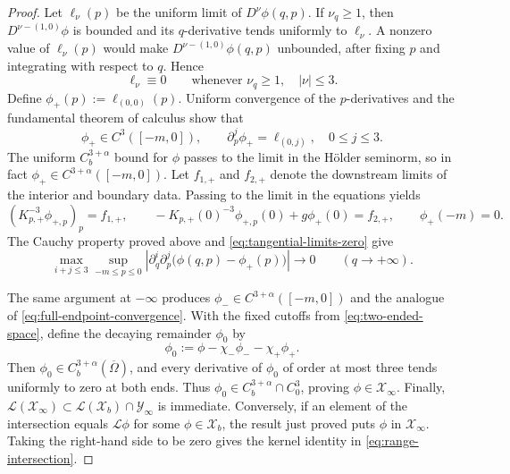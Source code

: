 \documentclass[10pt,a4paper]{amsart}
\theoremstyle{plain}
\begin{document}
\begin{proof}
		Let \(\ell_\nu(p)\) be the uniform limit of $D^\nu\phi(q,p)$.  If \(\nu_q\ge1\), then
		\(D^{\nu-(1,0)}\phi\) is bounded and its \(q\)-derivative tends uniformly to
		\(\ell_\nu\).  A nonzero value of \(\ell_\nu(p)\) would make
		\(D^{\nu-(1,0)}\phi(q,p)\) unbounded, after fixing
		\(p\) and integrating with respect to \(q\).   Hence
		\begin{equation}\label{eq:tangential-limits-zero}
			\ell_\nu\equiv0\qquad\text{whenever }\nu_q\ge1,\quad |\nu|\le3.
		\end{equation}
		Define \(\phi_+(p):=\ell_{(0,0)}(p)\).  Uniform convergence of the
		{$p$-derivatives and the fundamental theorem of calculus show that}
		\[
		\phi_+\in C^3([-m,0]),\qquad
		\partial_p^j\phi_+=\ell_{(0,j)},\quad 0\le j\le3.
		\]
		The uniform \(C_b^{3+\alpha}\) bound for \(\phi\) passes to the limit in
		the H\"older seminorm, so in fact \(\phi_+\in C^{3+\alpha}([-m,0])\).
	 {Let $f_{1,+}$ and $f_{2,+}$ denote the downstream limits of the interior and boundary data. Passing to the limit in the equations yields}
		\begin{equation*}
			(K_{p,+}^{-3}\phi_{+,p})_p=f_{1,+},\qquad
			-K_{p,+}(0)^{-3}\phi_{+,p}(0)+g\phi_+(0)=f_{2,+},\qquad
			\phi_+(-m)=0 .
		\end{equation*}
	{The Cauchy property proved above and \eqref{eq:tangential-limits-zero} give}
		\begin{equation}\label{eq:full-endpoint-convergence}
			\max_{i+j\le3}\sup_{-m\le p\le0}
			\left|\partial_q^i\partial_p^j
			\bigl(\phi(q,p)-\phi_+(p)\bigr)\right|
			\longrightarrow0\qquad(q\to+\infty).
		\end{equation}
		
		The same argument at \(-\infty\) produces
		\(\phi_-\in C^{3+\alpha}([-m,0])\) and the analogue of
		\eqref{eq:full-endpoint-convergence}. With the fixed cutoffs from
		{\eqref{eq:two-ended-space}, define the decaying remainder $\phi_0$ by}
		\[
		\phi_0:=\phi-\chi_-\phi_- -\chi_+\phi_+.
		\]
		Then \(\phi_0\in C_b^{3+\alpha}(\overline\Omega)\), and every derivative of
		\(\phi_0\) of order at most three tends uniformly to zero at both ends.
		Thus \(\phi_0\in C_b^{3+\alpha}\cap C_0^3\), proving
		\(\phi\in\mathscr X_\infty\).
		Finally,
		\(\mathscr L(\mathscr X_\infty)\subset\mathscr L(\mathscr X_b)\cap\mathscr Y_\infty\) is
		immediate.  Conversely, if an element of the intersection equals
		\(\mathscr L\phi\) for some \(\phi\in\mathscr X_b\), the result just proved puts
		\(\phi\) in \(\mathscr X_\infty\).  Taking the right-hand side to be zero gives the
		kernel identity in \eqref{eq:range-intersection}.	
	\end{proof}
\end{document}
